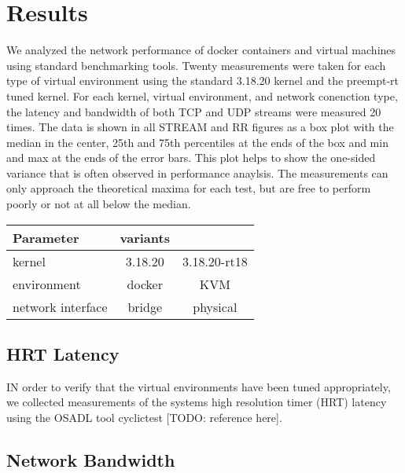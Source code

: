 \chapter{Results}
\label{cha:results}
\label{sec:results}
We analyzed the network performance of docker containers and virtual machines using standard benchmarking tools.  
Twenty measurements were taken for each type of virtual environment using the standard 3.18.20 kernel and the preempt-rt tuned kernel.
For each kernel, virtual environment, and network conenction type, the latency and bandwidth of both TCP and UDP streams were measured 20 times.
The data is shown in all STREAM and RR figures as a box plot with the median in the center, 25th and 75th percentiles at the ends of the box and min and max at the ends of the error bars.
This plot helps to show the one-sided variance that is often observed in performance anaylsis.  
The measurements can only approach the theoretical maxima for each test, but are free to perform poorly or not at all below the median.  

\begin{table}[ht!]
    \centering
    \begin{tabular}{|l|c|c|}
    \hline
    Parameter & variants & \\
    \hline \hline
    kernel & 3.18.20 & 3.18.20-rt18 \\ 
    environment & docker & KVM \\ 
    network interface & bridge & physical \\ 
    \hline
    \end{tabular}
\end{table}

\section{HRT Latency} %
\label{sec:hrtlatency}
IN order to verify that the virtual environments have been tuned appropriately, we collected measurements of the systems high resolution timer (HRT) latency using the OSADL tool cyclictest [TODO: reference here].


\section{Network Bandwidth} %
\label{sec:networkbandwidth}
